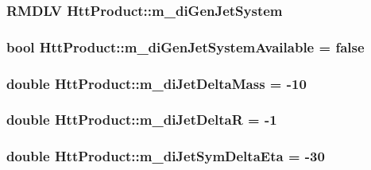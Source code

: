 \label{classHttProduct_a681ffc49f91457b1ff5d8a3a938cc6b6}
\hypertarget{classHttProduct_ad122b9b5efd27c7a930acb0c0c06c9c6}{
\subsubsection[{m\_\-diGenJetSystem}]{\setlength{\rightskip}{0pt plus 5cm}RMDLV {\bf HttProduct::m\_\-diGenJetSystem}}}
\label{classHttProduct_ad122b9b5efd27c7a930acb0c0c06c9c6}
\hypertarget{classHttProduct_add98b9d1ecc7acd2c77861aa295dea19}{
\subsubsection[{m\_\-diGenJetSystemAvailable}]{\setlength{\rightskip}{0pt plus 5cm}bool {\bf HttProduct::m\_\-diGenJetSystemAvailable} = false}}
\label{classHttProduct_add98b9d1ecc7acd2c77861aa295dea19}
\hypertarget{classHttProduct_a955310c3531e866279424134441817b8}{
\subsubsection[{m\_\-diJetDeltaMass}]{\setlength{\rightskip}{0pt plus 5cm}double {\bf HttProduct::m\_\-diJetDeltaMass} = -\/10}}
\label{classHttProduct_a955310c3531e866279424134441817b8}
\hypertarget{classHttProduct_a24e5e7cffc173ca220dac9da285f808a}{
\subsubsection[{m\_\-diJetDeltaR}]{\setlength{\rightskip}{0pt plus 5cm}double {\bf HttProduct::m\_\-diJetDeltaR} = -\/1}}
\label{classHttProduct_a24e5e7cffc173ca220dac9da285f808a}
\hypertarget{classHttProduct_a6fce97a5c2d17c85ef4fe7f43da9577a}{
\subsubsection[{m\_\-diJetSymDeltaEta}]{\setlength{\rightskip}{0pt plus 5cm}double {\bf HttProduct::m\_\-diJetSymDeltaEta} = -\/30}}
